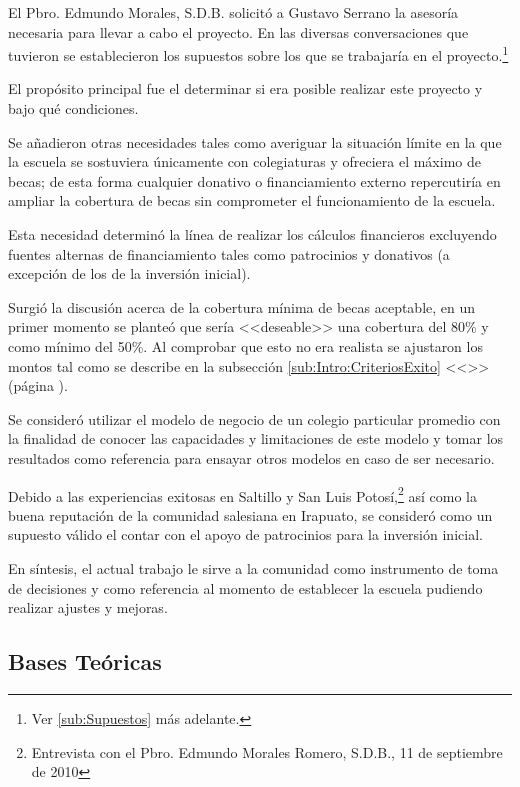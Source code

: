 El Pbro. Edmundo Morales, S.D.B. solicitó a Gustavo Serrano la asesoría necesaria para llevar a cabo el proyecto. En las diversas conversaciones que tuvieron se establecieron los supuestos sobre los que se trabajaría en el proyecto.\footnote{Ver \ref{sub:Supuestos} más adelante.}

El propósito principal fue el determinar si era posible realizar este proyecto y bajo qué condiciones.

Se añadieron otras necesidades tales como averiguar la situación límite en la que la escuela se sostuviera únicamente con colegiaturas y ofreciera el máximo de becas; de esta forma cualquier donativo o financiamiento externo repercutiría en ampliar la cobertura de becas sin comprometer el funcionamiento de la escuela.

Esta necesidad determinó la línea de realizar los cálculos financieros excluyendo fuentes alternas de financiamiento tales como patrocinios y donativos (a excepción de los de la inversión inicial).

Surgió la discusión acerca de la cobertura mínima de becas aceptable, en un primer momento se planteó que sería <<deseable>> una cobertura del 80\% y como mínimo del 50\%. Al comprobar que esto no era realista se ajustaron los montos tal como se describe en la subsección \ref{sub:Intro:CriteriosExito} <<>> (página \pageref{sub:Intro:CriteriosExito}).

Se consideró utilizar el modelo de negocio de un colegio particular promedio con la finalidad de conocer las capacidades y limitaciones de este modelo y tomar los resultados como referencia para ensayar otros modelos en caso de ser necesario.

Debido a las experiencias exitosas en Saltillo y San Luis Potosí,\footnote{Entrevista con el Pbro. Edmundo Morales Romero, S.D.B., 11 de septiembre de 2010} así como la buena reputación de la comunidad salesiana en Irapuato, se consideró como un supuesto válido el contar con el apoyo de patrocinios para la inversión inicial.

En síntesis, el actual trabajo le sirve a la comunidad como instrumento de toma de decisiones y como referencia al momento de establecer la escuela pudiendo realizar ajustes y mejoras.

\subsection{Bases Teóricas}
\label{sub:Intro:BasesTeoricas}


